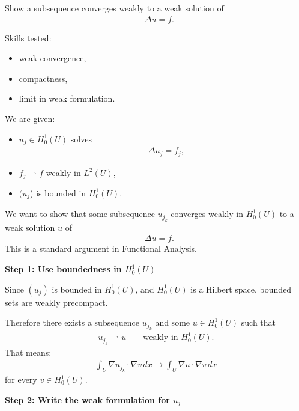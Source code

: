 \documentclass[12pt,a4paper]{report}
\begin{document}
\begin{description}
Show a subsequence converges weakly to a weak solution of
\begin{align*}
-\Delta u=f.
\end{align*}

Skills tested:

	\begin{itemize}
    \item weak convergence,
    \item compactness,
    \item limit in weak formulation.
	\end{itemize}

\HLINE


We are given:

\begin{itemize}
    \item $u_j\in H_0^1(U)$ solves
\begin{align*}
-\Delta u_j=f_j,
\end{align*}

    \item $f_j\rightharpoonup f$ weakly in $L^2(U)$,
    \item $(u_j$) is bounded in $H_0^1(U)$.
\end{itemize}

We want to show that some subsequence $u_{j_k}$ converges weakly in $H_0^1(U)$ to a weak solution $u$ of
\begin{align*}
-\Delta u=f.
\end{align*}
This is a standard  argument in Functional Analysis.

\begin{description}

\item \textbf{Step 1: Use boundedness in $H_0^1(U)$}

Since $(u_j)$ is bounded in $H_0^1(U)$, and $H_0^1(U)$ is a Hilbert space, bounded sets are weakly precompact.

Therefore there exists a subsequence $u_{j_k}$ and some $u\in H_0^1(U)$ such that
\begin{align*}
u_{j_k}\rightharpoonup u
\qquad\text{weakly in }H_0^1(U).
\end{align*}
That means:
\begin{align*}
\int_U \nabla u_{j_k}\cdot\nabla v\,dx
\to
\int_U \nabla u\cdot\nabla v\,dx
\end{align*}
for every $v\in H_0^1(U)$.

\item \textbf{Step 2: Write the weak formulation for $u_j$}


\end{description}
\end{description}
\end{document}
